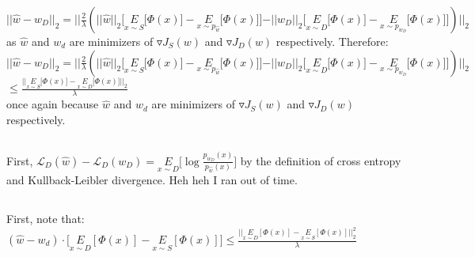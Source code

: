 \documentclass[]{article}
\begin{document}
$\vert \vert \hat{w} - w_D \vert \vert_2 = \vert \vert \frac{2}{\lambda}(\vert \vert \hat{w} \vert \vert_2 \lbrack \underset{x \sim S}{E} \lbrack \Phi(x) \rbrack - \underset{x \sim p_{\hat{w}}}{E} \lbrack \Phi(x) \rbrack \rbrack - \vert \vert w_D \vert \vert_2 \lbrack \underset{x \sim D}{E} \lbrack \Phi(x) \rbrack - \underset{x \sim p_{w_D}}{E} \lbrack \Phi(x) \rbrack \rbrack) \vert \vert_2$\\

\noindent as $\hat{w}$ and $w_d$ are minimizers of $\triangledown J_S(w)$ and $\triangledown J_D(w)$ respectively. Therefore:\\

$\vert \vert \hat{w} - w_D \vert \vert_2 = \vert \vert \frac{2}{\lambda}(\vert \vert \hat{w} \vert \vert_2 \lbrack \underset{x \sim S}{E} \lbrack \Phi(x) \rbrack - \underset{x \sim p_{\hat{w}}}{E} \lbrack \Phi(x) \rbrack \rbrack - \vert \vert w_D \vert \vert_2 \lbrack \underset{x \sim D}{E} \lbrack \Phi(x) \rbrack - \underset{x \sim p_{w_D}}{E} \lbrack \Phi(x) \rbrack \rbrack) \vert \vert_2$\\

$\le \frac{\vert \vert \underset{x \sim S}{E} \lbrack \Phi(x) \rbrack - \underset{x \sim D}{E} \lbrack \Phi(x) \rbrack \vert \vert_2}{\lambda}$\\

\noindent once again because $\hat{w}$ and $w_d$ are minimizers of $\triangledown J_S(w)$ and $\triangledown J_D(w)$ respectively.

\subsection{}

First, $\mathcal{L}_D(\hat{w}) - \mathcal{L}_D({w_D}) = \underset{x \sim D}{E}\lbrack \log \frac{p_{w_D}(x)}{p_{\hat{w}}(x)} \rbrack$ by the definition of cross entropy and Kullback-Leibler divergence. Heh heh I ran out of time. 
	
\subsection{}

First, note that:\\

$(\hat{w} -w_d) \cdot \lbrack \underset{x \sim D}{E}[\Phi(x)] - \underset{x \sim S}{E}[\Phi(x)] \rbrack \le \frac{\vert \vert \underset{x \sim D}{E}[\Phi(x)] - \underset{x \sim S}{E}[\Phi(x)]\vert \vert_2^2}{\lambda}$
\end{document}
